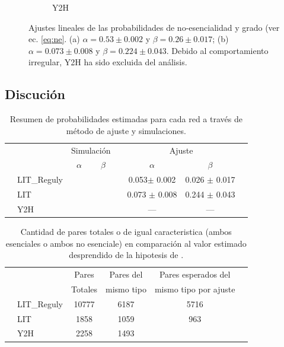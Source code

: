 \begin{figure}[!ht]
\begin{subfigure}[b]{0.4\columnwidth}
        \caption{\label{fig:y2h} Y2H}
    \end{subfigure}
    \caption{\label{fig:fit} Ajustes lineales de las probabilidades de no-esencialidad y grado (ver ec. \ref{eq:ne}. 
    (a) $\alpha = 0.53 \pm 0.002 $ y $\beta = 0.26 \pm 0.017$; (b) $\alpha = 0.073 \pm 0.008$ y $\beta = 0.224 \pm 0.043$. 
    Debido al comportamiento irregular, Y2H ha sido excluida del an\'alisis.}
\end{figure}





\subsection{Discuci\'on}
\begin{table}[!ht]
    \centering
    \caption{\label{tab:probas} Resumen de probabilidades estimadas para cada red a trav\'es de m\'etodo de ajuste
y simulaciones.}
    {\scriptsize
    \begin{tabularx}{.9\columnwidth}{XlccXccX}
        \hline\hline
        &               &  \multicolumn{2}{c}{Simulaci\'on}  &&  \multicolumn{2}{c}{Ajuste}          &      \\
        \cline{3-4} \cline{6-7}
        &               &   $\alpha$    & $\beta$            &&   $\alpha$       &       $\beta$     & \\
        \hline
        & LIT\_Reguly   &    &         && 0.053$ \pm$ 0.002  & 0.026 $\pm$ 0.017       &               \\
        & LIT           &    &         && 0.073 $\pm$ 0.008  & 0.244 $\pm$ 0.043       &               \\
        & Y2H           &    &         &&    ---             &   ---              &               \\
        \hline\hline
    \end{tabularx}
    }
\end{table}


\begin{table}[!ht]
    \centering
    \caption{\label{tab:pairs} Cantidad de pares totales o de igual caracteristica (ambos esenciales o ambos no esenciale)
    en comparaci\'on al valor estimado desprendido de la hipotesis de \citet{he2006}.}
    {\scriptsize
    \begin{tabularx}{.9\columnwidth}{XlcccX}
        \hline\hline
        &               & Pares   & Pares del   & Pares esperados del       \\ 
        \cline{5-6}
        &               & Totales & mismo tipo  & mismo tipo por ajuste        &      \\
        \hline
        & LIT\_Reguly   & 10777   & 6187        &         5716          &               \\
        & LIT           & 1858    & 1059        &          963          &               \\
        & Y2H           & 2258    & 1493        &                       &               \\
        \hline\hline
    \end{tabularx}
    }
\end{table}
